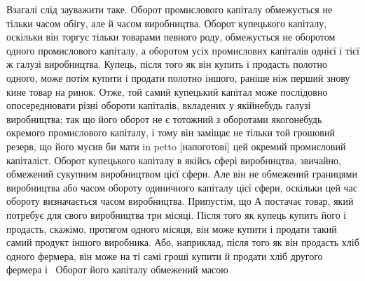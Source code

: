 Взагалі слід зауважити таке. Оборот промислового капіталу
обмежується не тільки часом обігу, але й часом виробництва.
Оборот купецького капіталу, оскільки він торгує тільки товарами
певного роду, обмежується не оборотом одного промислового
капіталу, а оборотом усіх промислових капіталів однієї
і тієї ж галузі виробництва. Купець, після того як він купить
і продасть полотно одного, може потім купити і продати полотно
іншого, раніше ніж перший знову кине товар на ринок.
Отже, той самий купецький капітал може послідовно опосереднювати
різні обороти капіталів, вкладених у якійнебудь галузі
виробництва; так що його оборот не є тотожний з оборотами
якогонебудь окремого промислового капіталу, і тому він заміщає
не тільки той грошовий резерв, що його мусив би мати in
petto [напоготові] цей окремий промисловий капіталіст. Оборот
купецького капіталу в якійсь сфері виробництва, звичайно, обмежений
сукупним виробництвом цієї сфери. Але він не обмежений
границями виробництва або часом обороту одиничного
капіталу цієї сфери, оскільки цей час обороту визначається часом
виробництва. Припустім, що $А$ постачає товар, який потребує
для свого виробництва три місяці. Після того як купець
купить його і продасть, скажімо, протягом одного місяця, він
може купити і продати такий самий продукт іншого виробника.
Або, наприклад, після того як він продасть хліб одного фермера,
він може на ті самі гроші купити й продати хліб другого
фермера і~ Оборот його капіталу обмежений масою
\parbreak{}  %
